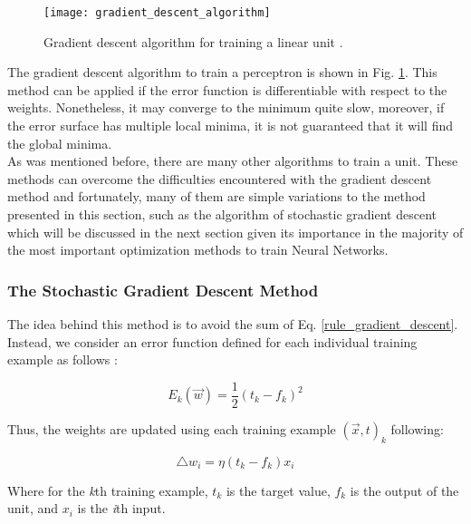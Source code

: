 \begin{figure}
\centering
\texttt{[image: gradient\_descent\_algorithm]}
\caption[Gradient descent algorithm for training a linear unit.]{Gradient descent algorithm for training a linear unit \cite{machine_mitchell}.}
\label{fig:gradient_descent_algorithm}
\end{figure}

The gradient descent algorithm to train a perceptron is shown in Fig. \ref{fig:gradient_descent_algorithm}. This method can be applied if the error function is differentiable with respect to the weights. Nonetheless, it may converge to the minimum quite slow, moreover, if the error surface has multiple local minima, it is not guaranteed that it will find the global minima.\\

As was mentioned before, there are many other algorithms to train a unit. These methods can overcome the difficulties encountered with the gradient descent method and fortunately, many of them are simple variations to the method presented in this section, such as the algorithm of stochastic gradient descent which will be discussed in the next section given its importance in the majority of the most important optimization methods to train Neural Networks.

\subsubsection{The Stochastic Gradient Descent Method}
The idea behind this method is to avoid the sum of Eq. \ref{rule_gradient_descent}. Instead, we consider an error function defined for each individual training example as follows \cite{machine_mitchell}:

\begin{equation}
	 E_{k}(\vec{w})=\frac{1}{2}(t_{k}-f_{k})^{2}
\end{equation}

Thus, the weights are updated using each training example $(\vec{x},t)_{k}$ following:

\begin{equation}
\label{rule_gradient_descent}
	 \triangle w_{i} = \eta (t_{k}-f_{k})x_{i}
\end{equation}

Where for the \textit{k}th training example, $t_{k}$ is the target value, $f_{k}$ is the output of the unit, and $x_{i}$ is the \textit{i}th input.\\

